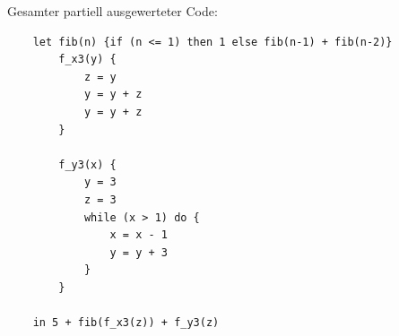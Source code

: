 \documentclass[11pt,a4paper]{article}
\begin{document}
Gesamter partiell ausgewerteter Code:

\begin{verbatim}
    let fib(n) {if (n <= 1) then 1 else fib(n-1) + fib(n-2)}
        f_x3(y) {
            z = y
            y = y + z
            y = y + z
        }

        f_y3(x) {
            y = 3
            z = 3
            while (x > 1) do {
                x = x - 1
                y = y + 3
            }
        }

    in 5 + fib(f_x3(z)) + f_y3(z)

\end{verbatim}
\end{document}
